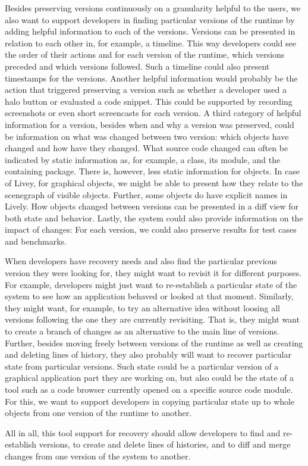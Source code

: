 Besides preserving versions continuously on a granularity helpful to the users, we also want to support developers in finding particular versions of the runtime by adding helpful information to each of the versions.
Versions can be presented in relation to each other in, for example, a timeline.
This way developers could see the order of their actions and for each version of the runtime, which versions preceded and which versions followed.
Such a timeline could also present timestamps for the versions.
Another helpful information would probably be the action that triggered preserving a version such as whether a developer used a halo button or evaluated a code snippet.
This could be supported by recording screenshots or even short screencasts for each version.
A third category of helpful information for a version, besides when and why a version was preserved, could be information on what was changed between two version: which objects have changed and how have they changed.
What source code changed can often be indicated by static information as, for example, a class, its module, and the containing package.
There is, however, less static information for objects.
In case of Livey, for graphical objects, we might be able to present how they relate to the scenegraph of visible objects.
Further, some objects do have explicit names in Lively.
How objects changed between versions can be presented in a diff view for both state and behavior.
Lastly, the system could also provide information on the impact of changes: For each version, we could also preserve results for test cases and benchmarks.

When developers have recovery needs and also find the particular previous version they were looking for, they might want to revisit it for different purposes.
For example, developers might just want to re-establish a particular state of the system to see how an application behaved or looked at that moment.
Similarly, they might want, for example, to try an alternative idea without loosing all versions following the one they are currently revisiting.
That is, they might want to create a branch of changes as an alternative to the main line of versions.
Further, besides moving freely between versions of the runtime as well as creating and deleting lines of history, they also probably will want to recover particular state from particular versions.
Such state could be a particular version of a graphical application part they are working on, but also could be the state of a tool such as a code browser currently opened on a specific source code module.
For this, we want to support developers in copying particular state up to whole objects from one version of the runtime to another.

All in all, this tool support for recovery should allow developers to find and re-establish versions, to create and delete lines of histories, and to diff and merge changes from one version of the system to another.
